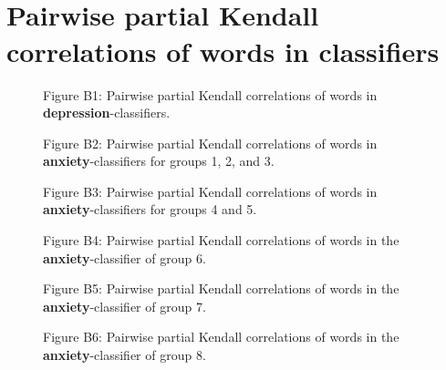 \documentclass[11pt, a4paper]{article}
\begin{document}
\newpage
\section{\\ Pairwise partial Kendall correlations of words in classifiers}

\begin{figure}[hbt!]
\centering
\vspace{-0.7cm}

\caption*{Figure B1: Pairwise partial Kendall correlations of words in \textbf{depression}-classifiers.}
\end{figure}

\begin{figure}
\centering
\vspace{-0.7cm}

\caption*{Figure B2: Pairwise partial Kendall correlations of words in \textbf{anxiety}-classifiers for groups 1, 2, and 3.}
\end{figure}

\begin{figure}
\centering
\vspace{-0.7cm}

\caption*{Figure B3: Pairwise partial Kendall correlations of words in \textbf{anxiety}-classifiers for groups 4 and 5.}
\end{figure}

\begin{figure}
\centering
\vspace{-0.7cm}

\caption*{Figure B4: Pairwise partial Kendall correlations of words in the \textbf{anxiety}-classifier of group 6.}
\end{figure}

\begin{figure}
\centering
\vspace{-0.7cm}

\caption*{Figure B5: Pairwise partial Kendall correlations of words in the \textbf{anxiety}-classifier of group 7.}
\end{figure}

\begin{figure}
\centering
\vspace{-0.7cm}

\caption*{Figure B6: Pairwise partial Kendall correlations of words in the \textbf{anxiety}-classifier of group 8.}
\end{figure}
\end{document}
